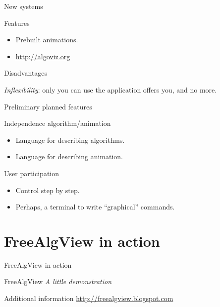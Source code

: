\documentclass[12pt,xcolor=svgnames]{beamer}
\begin{document}
\begin{frame}{New systems}
  \begin{block}{Features}
    \begin{itemize}
      \item Prebuilt animations.
      \item \url{http://algoviz.org}
    \end{itemize}
  \end{block}

  \begin{block}{Disadvantages}
    \begin{center}
      \textit{Inflexibility}: only you can use the application offers you, and
      no more.
    \end{center}
  \end{block}
\end{frame}

\begin{frame}{Preliminary planned features}

  \begin{block}{Independence algorithm/animation}
    \begin{itemize}
    \item Language for describing algorithms.
    \item Language for describing animation.
    \end{itemize}
  \end{block}

  \begin{block}{User participation}
    \begin{itemize}
    \item Control step by step.
    \item Perhaps, a terminal to write ``graphical'' commands.
    \end{itemize}
  \end{block}

\end{frame}

\section{FreeAlgView in action}

\begin{frame}{FreeAlgView in action}
  \begin{block}{FreeAlgView}
    \textit{A little demonstration}
  \end{block}

  \pause

  \begin{block}{Additional information}
    \url{http://freealgview.blogspot.com}
  \end{block}
\end{frame}
\end{document}
